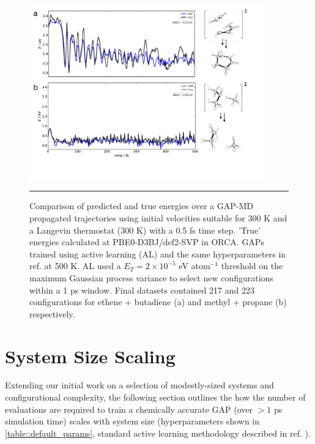 \documentclass[11pt]{article}
\numberwithin{equation}{subsection}
\begin{document}
\begin{figure}[h!]
\centering
\vspace{0.4cm}
\includegraphics[width=0.9\textwidth]{figSX30.pdf}
\vspace{0.0cm}
\hrule
\vspace{0.1cm}
\caption{Comparison of predicted and true energies over a GAP-MD propagated trajectories using initial velocities suitable for 300 K and a Langevin thermostat (300 K) with a 0.5 fs time step. 'True' energies calculated at PBE0-D3BJ/def2-SVP in ORCA. GAPs trained using active learning (AL) and the same hyperparameters in ref. \cite{gaptrain2021} at 500 K. AL used a $E_T = 2\times10^{-5}$ eV atom${}^{-1}$ threshold on the maximum Gaussian process variance to select new configurations within a 1 ps window. Final datasets contained 217 and 223 configurations for ethene + butadiene (a) and methyl + propane (b) respectively.}
\label{fig::SX30}
\end{figure}



\clearpage
\section{System Size Scaling} \label{section::SI_system_size}

Extending our initial work on a selection of modestly-sized systems and configurational complexity,\supercite{gaptrain2021} the following section outlines the how the number of evaluations are required to train a chemically accurate GAP (over $>1$ ps simulation time) scales with system size (hyperparameters shown in \tablename{ \ref{table::default_params}}, standard active learning methodology described in ref. \cite{gaptrain2021}).
\vspace{0.3cm}
\end{document}
